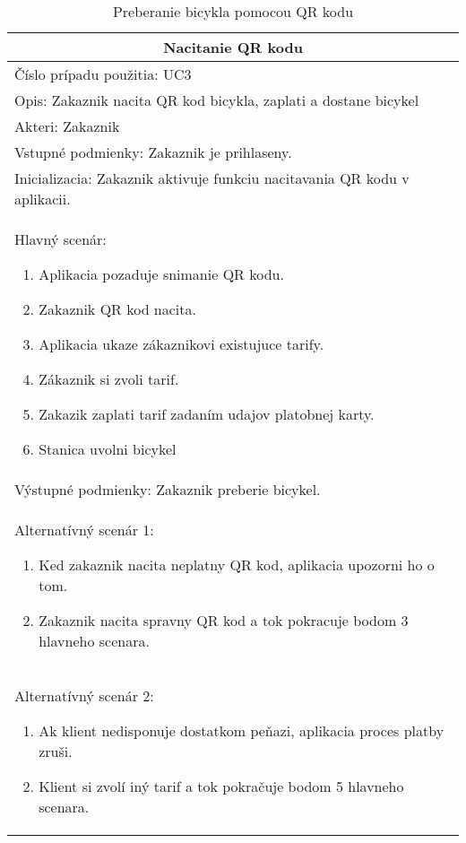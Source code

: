 \begin{table}[h]
  \centering
  \begin{tabular}{|p{12cm}|}
   \hline
   \multicolumn{1}{|c|}{ \textbf{Nacitanie QR kodu}} \\
   \hline
   Číslo prípadu použitia: UC3\\
   \hline
   Opis: Zakaznik nacita QR kod bicykla, zaplati a dostane bicykel\\
   \hline
   Akteri: Zakaznik\\
   \hline
   Vstupné podmienky: Zakaznik je prihlaseny.\\
   \hline
   Inicializacia: Zakaznik aktivuje funkciu nacitavania QR kodu v aplikacii.\\
   \hline
   Hlavný scenár:
   \begin{enumerate} 
       \item Aplikacia pozaduje snimanie QR kodu.
       \item Zakaznik QR kod nacita. 
       \item Aplikacia ukaze zákaznikovi existujuce tarify.
       \item Zákaznik si zvoli tarif. 
       \item Zakazik zaplati tarif zadaním udajov platobnej karty.
       \item Stanica uvolni bicykel
   \end{enumerate}\\
   \hline
   Výstupné podmienky: Zakaznik preberie bicykel.\\
   \hline
   Alternatívný scenár 1:
   \begin{enumerate} 
       \item Ked zakaznik nacita neplatny QR kod, aplikacia upozorni ho 
             o tom.
       \item Zakaznik nacita spravny QR kod a tok pokracuje bodom 3 hlavneho scenara.
   \end{enumerate}\\
   \hline
   Alternatívný scenár 2:
   \begin{enumerate} 
       \item Ak klient nedisponuje dostatkom peňazi, aplikacia proces
             platby zruši. 
       \item Klient si zvolí iný tarif a tok pokračuje bodom 5 hlavneho scenara.
   \end{enumerate}\\
   \hline
  \end{tabular}
  \caption{Preberanie bicykla pomocou QR kodu}
  \label{tab:use_case_steps}
\end{table}

